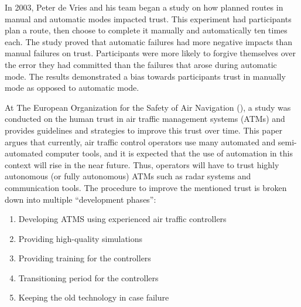 \documentclass[runningheads,a4paper]{llncs}
\begin{document}
In 2003, Peter de Vries and his team began a study on how planned routes in manual and automatic modes impacted trust\cite{de2003effects}. This experiment had participants plan a route, then choose to complete it manually and automatically ten times each.  The study proved that automatic failures had more negative impacts than manual failures on trust.  Participants were more likely to forgive themselves over the error they had committed than the failures that arose during automatic mode.  The results demonstrated a bias towards participants trust in manually mode as opposed to automatic mode.

At The European Organization for the Safety of Air Navigation (\cite{kelly2003guidelines}), a study was conducted on the human trust in air traffic management systems (ATMs) and provides guidelines and strategies to improve this trust over time. This paper argues that currently, air traffic control operators use many automated and semi-automated computer tools, and it is expected that the use of automation in this context will rise in the near future. Thus, operators will have to trust highly autonomous (or fully autonomous) ATMs such as radar systems and communication tools. The procedure to improve the mentioned trust is broken down into multiple ``development phases'':

\begin{enumerate}
    \item Developing ATMS using experienced air traffic controllers
    \item Providing high-quality simulations
    \item Providing training for the controllers
    \item Transitioning period for the controllers
    \item Keeping the old technology in case failure
\end{enumerate}
\end{document}
